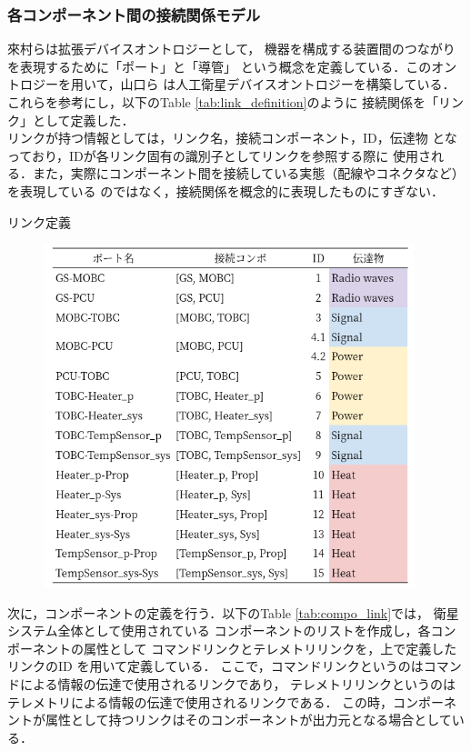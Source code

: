 \documentclass[11pt]{article}
\begin{document}
\subsubsection{各コンポーネント間の接続関係モデル}
來村ら\cite{Kitamura01}は拡張デバイスオントロジーとして，
機器を構成する装置間のつながりを表現するために「ポート」と「導管」%
という概念を定義している．このオントロジーを用いて，山口ら\cite{Yamaguchi2014}
は人工衛星デバイスオントロジーを構築している．
これらを参考にし，以下のTable \ref{tab:link_definition}のように
接続関係を「リンク」として定義した．\\%
リンクが持つ情報としては，リンク名，接続コンポーネント，ID，伝達物
となっており，IDが各リンク固有の識別子としてリンクを参照する際に
使用される．また，実際にコンポーネント間を接続している実態（配線やコネクタなど）を表現している
のではなく，接続関係を概念的に表現したものにすぎない．

\newpage
\begin{table}[H]
   \centering
   \caption{リンク定義} 
   \label{tab:link_definition}
\end{table} 
\vspace{-2zh}
\begin{figure}[H]
   \centering
      \includegraphics[height=10cm]{figure/port_definition.png}
\end{figure}
次に，コンポーネントの定義を行う．以下のTable \ref{tab:compo_link}では，
衛星システム全体として使用されている
コンポーネントのリストを作成し，各コンポーネントの属性として
コマンドリンクとテレメトリリンクを，上で定義したリンクのID
を用いて定義している．
ここで，コマンドリンクというのはコマンドによる情報の伝達で使用されるリンクであり，
テレメトリリンクというのはテレメトリによる情報の伝達で使用されるリンクである．
この時，コンポーネントが属性として持つリンクはそのコンポーネントが出力元となる場合としている．
\end{document}
